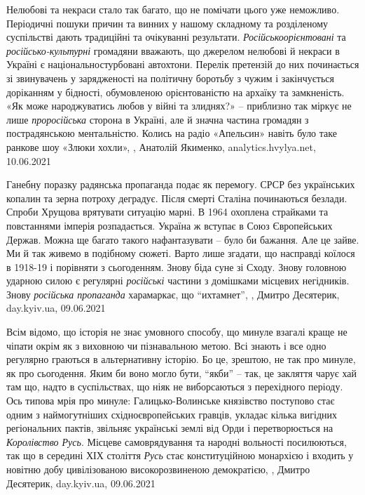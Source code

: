 Нелюбові та некраси стало так багато, що не помічати цього уже неможливо.
Періодичні пошуки причин та винних у нашому складному та розділеному
суспільстві дають традиційні та очікуванні результати. \emph{Російськоорієнтовані} та
\emph{російсько-культурні} громадяни вважають, що джерелом нелюбові й некраси в
Україні є національностурбовані автохтони. Перелік претензій до них починається
зі звинувачень у зарядженості на політичну боротьбу з чужим і закінчується
доріканням у бідності, обумовленою орієнтованістю на архаїку та замкненість.
«Як може народжуватись любов у війні та злиднях?» – приблизно так міркує не
лише \emph{проросійська} сторона в Україні, але й значна частина громадян з
пострадянською ментальністю. Колись на радіо «Апельсин» навіть було таке
ранкове шоу «Злюки хохли»,
, Анатолій Якименко, analytics.hvylya.net, 10.06.2021

Ганебну поразку радянська пропаганда подає як перемогу. СРСР без українських
копалин та зерна потроху деградує. Після смерті Сталіна починаються безлади.
Спроби Хрущова врятувати ситуацію марні. В 1964 охоплена страйками та
повстаннями імперія розпадається.  Україна ж вступає в Союз Європейських
Держав.  Можна ще багато такого нафантазувати – було би бажання.  Але це зайве.
Ми й так живемо в подібному сюжеті. Варто лише згадати, що насправді коїлося в
1918-19 і порівняти з сьогоденням. Знову біда суне зі Сходу. Знову головною
ударною силою є регулярні \emph{російські} частини з домішками місцевих негідників.
Знову \emph{російська пропаганда} харамаркає, що \enquote{ихтамнет},
, Дмитро Десятерик, day.kyiv.ua, 09.06.2021

Всім відомо, що історія не знає умовного способу, що минуле взагалі краще не
чіпати окрім як з виховною чи пізнавальною метою. Всі знають і все одно
регулярно граються в альтернативну історію. Бо це, зрештою, не так про минуле,
як про сьогодення. Яким би воно могло бути, \enquote{якби} – так, це закляття
чарує хай там що, надто в суспільствах, що ніяк не виборсаються з перехідного
періоду.  Ось типова мрія про минуле: Галицько-Волинське князівство поступово
стає одним з наймогутніших східноєвропейських гравців, укладає кілька вигідних
регіональних пактів, звільняє українські землі від Орди і перетворюється на
\emph{Королівство Русь}. Місцеве самоврядування та народні вольності
посилюються, так що в середині ХІХ століття \emph{Русь} стає конституційною
монархією і входить у новітню добу цивілізованою високорозвиненою демократією,
, Дмитро Десятерик, day.kyiv.ua, 09.06.2021

